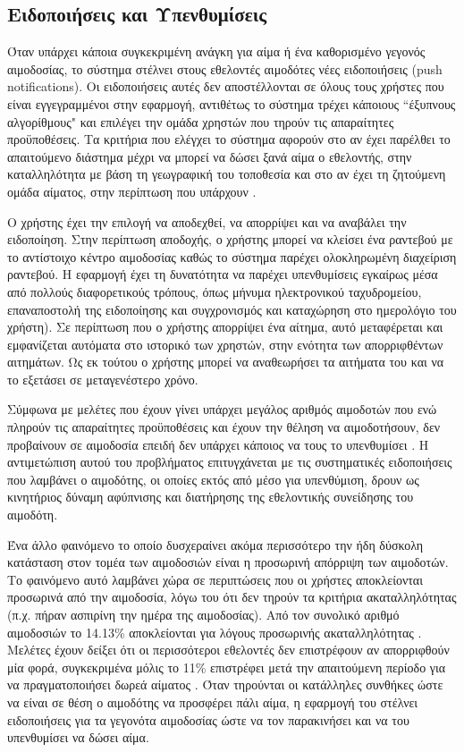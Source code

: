 	\subsection{Ειδοποιήσεις και Υπενθυμίσεις}
		
		 Όταν υπάρχει κάποια συγκεκριμένη ανάγκη για αίμα ή ένα καθορισμένο γεγονός αιμοδοσίας, το σύστημα στέλνει στους εθελοντές αιμοδότες νέες ειδοποιήσεις (push notifications). Οι ειδοποιήσεις αυτές δεν αποστέλλονται σε όλους τους χρήστες που είναι εγγεγραμμένοι στην εφαρμογή, αντιθέτως το σύστημα τρέχει κάποιους ``έξυπνους αλγορίθμους" και επιλέγει την ομάδα χρηστών που τηρούν τις απαραίτητες προϋποθέσεις. Τα κριτήρια που ελέγχει το σύστημα αφορούν στο αν έχει παρέλθει το απαιτούμενο διάστημα μέχρι να μπορεί να δώσει ξανά αίμα ο εθελοντής, στην καταλληλότητα με βάση τη γεωγραφική του τοποθεσία και στο αν έχει τη ζητούμενη ομάδα αίματος, στην περίπτωση που υπάρχουν .
		 
		
		Ο χρήστης έχει την επιλογή να αποδεχθεί, να απορρίψει και να αναβάλει την ειδοποίηση. Στην περίπτωση αποδοχής, ο χρήστης μπορεί να κλείσει ένα ραντεβού με το αντίστοιχο κέντρο αιμοδοσίας καθώς το σύστημα παρέχει ολοκληρωμένη διαχείριση ραντεβού. Η εφαρμογή έχει τη δυνατότητα να παρέχει υπενθυμίσεις εγκαίρως μέσα από πολλούς διαφορετικούς τρόπους, όπως μήνυμα ηλεκτρονικού ταχυδρομείου, επαναποστολή της ειδοποίησης και συγχρονισμός και καταχώρηση στο ημερολόγιο του χρήστη). Σε περίπτωση που ο χρήστης απορρίψει ένα αίτημα, αυτό μεταφέρεται και εμφανίζεται αυτόματα στο ιστορικό των χρηστών, στην ενότητα των απορριφθέντων αιτημάτων. Ως εκ τούτου ο χρήστης μπορεί να αναθεωρήσει τα αιτήματα του και να το εξετάσει σε μεταγενέστερο χρόνο. 
		
		 Σύμφωνα με μελέτες που έχουν γίνει υπάρχει μεγάλος αριθμός αιμοδοτών που ενώ πληρούν τις απαραίτητες προϋποθέσεις και έχουν την θέληση να αιμοδοτήσουν, δεν προβαίνουν σε αιμοδοσία επειδή δεν υπάρχει κάποιος να τους το υπενθυμίσει \cite{Marantidou2007}. Η αντιμετώπιση αυτού του προβλήματος επιτυγχάνεται με τις συστηματικές ειδοποιήσεις που λαμβάνει ο αιμοδότης, οι οποίες εκτός από μέσο για υπενθύμιση, δρουν ως κινητήριος δύναμη αφύπνισης και διατήρησης της εθελοντικής συνείδησης του αιμοδότη.
		 
		 Ένα άλλο φαινόμενο το οποίο δυσχεραίνει ακόμα περισσότερο την ήδη δύσκολη κατάσταση στον τομέα των αιμοδοσιών είναι η προσωρινή απόρριψη των αιμοδοτών.  Το φαινόμενο αυτό  λαμβάνει χώρα σε περιπτώσεις που οι χρήστες αποκλείονται προσωρινά από την αιμοδοσία, λόγω του ότι δεν τηρούν τα κριτήρια ακαταλληλότητας (π.χ. πήραν ασπιρίνη την ημέρα της αιμοδοσίας). Από τον συνολικό αριθμό αιμοδοσιών το 14.13\% αποκλείονται για λόγους προσωρινής ακαταλληλότητας \cite{WorldHealth}. Μελέτες έχουν δείξει ότι οι περισσότεροι εθελοντές δεν επιστρέφουν αν απορριφθούν μία φορά, συγκεκριμένα μόλις το 11\% επιστρέφει μετά την απαιτούμενη περίοδο για να πραγματοποιήσει δωρεά αίματος \cite{halperin1998effect}. Όταν τηρούνται οι κατάλληλες συνθήκες ώστε να είναι σε θέση ο αιμοδότης να προσφέρει πάλι αίμα, η εφαρμογή του στέλνει ειδοποιήσεις για τα γεγονότα αιμοδοσίας ώστε να τον παρακινήσει και να του υπενθυμίσει να δώσει αίμα.
		 
